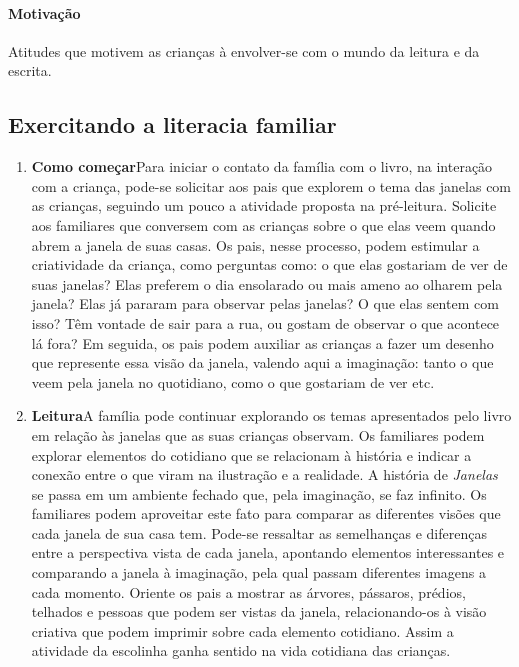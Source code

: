 \documentclass[11pt]{extarticle}
\begin{document}
\paragraph{Motivação} Atitudes que motivem as crianças à envolver-se com 
o mundo da leitura e da escrita.

\subsection{Exercitando a literacia familiar}


\begin{enumerate}
\item \textbf{Como começar}\quad Para iniciar o contato da família com o livro, na interação com a criança, pode-se solicitar aos pais que explorem o tema das janelas com as crianças, seguindo um pouco a atividade proposta na pré-leitura.
Solicite aos familiares que conversem com as crianças sobre o que elas veem quando abrem a janela de suas casas. Os pais, nesse processo, podem estimular a criatividade da criança, como perguntas como: o que elas gostariam de ver de suas janelas? Elas preferem o dia ensolarado ou mais ameno ao olharem pela janela? Elas já pararam para observar pelas janelas? O que elas sentem com isso? Têm vontade de sair para a rua, ou gostam de observar o que acontece lá fora?
Em seguida, os pais podem auxiliar as crianças a fazer um desenho que represente essa visão da janela, valendo aqui a imaginação: tanto o que veem pela janela no quotidiano, como o que gostariam de ver etc.




\item \textbf{Leitura}\quad A família pode continuar explorando os temas apresentados pelo livro em relação às janelas que as suas crianças observam.
Os familiares podem explorar 
elementos do cotidiano que se relacionam à história e indicar a conexão 
entre o que viram na ilustração e a realidade. A história de \textit{Janelas}
se passa em um ambiente fechado que, pela imaginação, se faz infinito.
Os familiares podem aproveitar este fato 
para comparar as diferentes visões que cada janela de sua casa tem.
Pode-se ressaltar as semelhanças e diferenças entre a perspectiva vista de cada janela, apontando elementos interessantes e comparando a janela à imaginação, pela qual passam diferentes imagens a cada momento.
Oriente os pais a mostrar as 
árvores, pássaros, prédios, telhados e pessoas que podem ser vistas da janela, relacionando-os à visão criativa que podem imprimir sobre cada elemento cotidiano.
Assim a atividade da escolinha ganha sentido na vida cotidiana das crianças.



\end{enumerate}
\end{document}
